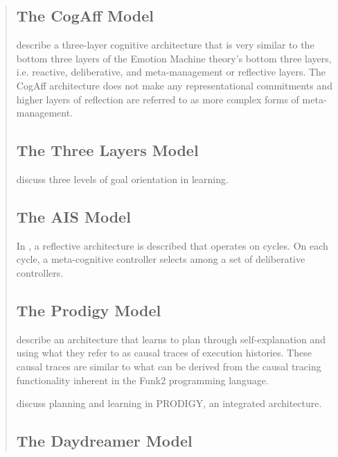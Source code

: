 \begin{quotation}
\subsection{The CogAff Model}

\cite{sloman2001vaa} describe a three-layer cognitive architecture that is very similar to the bottom three layers of the Emotion Machine theory's bottom three layers, i.e. reactive, deliberative, and meta-management or reflective layers.
The CogAff architecture does not make any representational commitments and higher layers of reflection are referred to as more complex forms of meta-management.

\subsection{The Three Layers Model}

\cite{ngbereiter1995tlgol} discuss three levels of goal orientation in learning.

\subsection{The AIS Model}

In \cite{hayesroth1995aai}, a reflective architecture is described that operates on cycles.
On each cycle, a meta-cognitive controller selects among a set of deliberative controllers.

\subsection{The Prodigy Model}

\cite{carbonell1991pia} describe an architecture that learns to plan through self-explanation and using what they refer to as causal traces of execution histories.
These causal traces are similar to what can be derived from the causal tracing functionality inherent in the Funk2 programming language.

\cite{carbonell1995palp} discuss planning and learning in PRODIGY, an integrated architecture.

\subsection{The Daydreamer Model}


\end{quotation}
